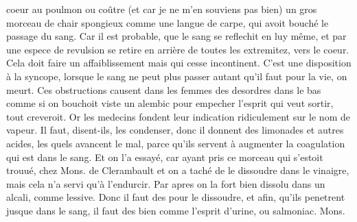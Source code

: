 coeur au poulmon ou co\^{u}tre (et car je ne m'en souviens pas bien) un gros morceau de chair spongieux comme une langue de carpe, qui avoit bouch\'{e} le passage du sang. Car il est probable, que le sang
se reflechit en luy m\^{e}me, et par une espece de revulsion se retire en arri\`{e}re de toutes les extremitez, vers le coeur. Cela doit faire un affaiblissement
mais qui cesse incontinent. C'est une disposition \`{a} la syncope, lorsque le sang ne peut plus passer autant qu'il faut pour la vie, on meurt. Ces obstructions causent dans les femmes des desordres dans le bas
comme si on bouchoit viste un alembic pour empecher l'esprit qui veut sortir, tout creveroit. Or les medecins fondent leur indication ridiculement sur le nom de vapeur. Il faut, disent-ils, les condenser, donc il donnent des limonades et autres acides, les quels avancent le mal, parce qu'ils servent \`{a} augmenter la coagulation qui est dans le sang. Et on l'a essay\'{e}, car ayant pris ce morceau qui s'estoit trouu\'{e}, chez Mons. de Clerambault\protect{} et on a tach\'{e} de le dissoudre dans le vinaigre, mais cela n'a servi qu'\`{a} l'endurcir. Par apres on la fort bien dissolu dans un alcali, comme lessive. Donc il faut des
pour le dissoudre, et afin, qu'ils penetrent jusque dans le sang, il faut des
bien 
 comme l'esprit d'urine, ou salmoniac.
Mons. 
